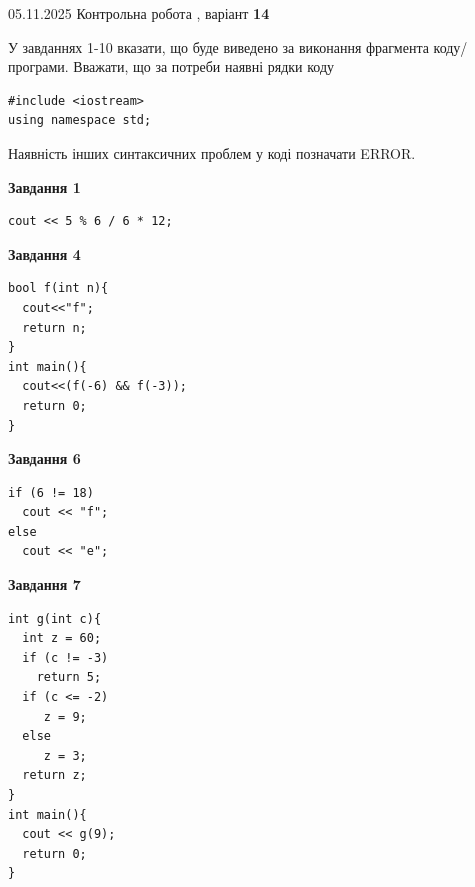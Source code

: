 \documentclass[12pt, ukrainian]{article}
\begin{document}
\newpage

{\Large{05.11.2025 Контрольна робота , варіант  \No \textbf { 14 }\par}}
{
\begin {large}
У завданнях 1-10 вказати, що буде виведено за виконання фрагмента коду/про\-гра\-ми.
Вважати, що за потреби наявні рядки коду
\begin{verbatim}
#include <iostream>
using namespace std;
\end{verbatim}
Наявність інших синтаксичних проблем у коді позначати ERROR.

\begin{minipage}[t]{7.0cm}

\begin{center}
\textbf{Завдання 1}
\end{center}
\vspace{-8mm}

\begin{verbatim}
cout << 5 % 6 / 6 * 12;
\end{verbatim}



\begin{center}
\textbf{Завдання 4}
\end{center}
\vspace{-8mm}

\begin{verbatim}
bool f(int n){
  cout<<"f";
  return n;
}
int main(){
  cout<<(f(-6) && f(-3));
  return 0;
}
\end{verbatim}



\begin{center}
\textbf{Завдання 6}
\end{center}
\vspace{-8mm}

\begin{verbatim}
if (6 != 18)
  cout << "f";
else
  cout << "e";
\end{verbatim}



\begin{center}
\textbf{Завдання 7}
\end{center}
\vspace{-8mm}

\begin{verbatim}
int g(int c){
  int z = 60;
  if (c != -3)
    return 5;
  if (c <= -2)
     z = 9;
  else
     z = 3;
  return z;
}
int main(){
  cout << g(9);
  return 0;
}
\end{verbatim}


\end{minipage}
\end{large}}
\end{document}
